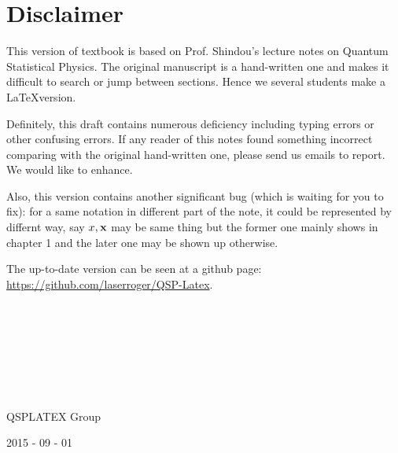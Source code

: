﻿\chapter*{Disclaimer}

This version of textbook is based on Prof. Shindou's lecture notes on Quantum Statistical Physics. The original manuscript is a hand-written one and makes it difficult to search or jump between sections. Hence we several students make a \LaTeX version. 

Definitely, this draft contains numerous deficiency including typing errors or other confusing errors. If any reader of this notes found something incorrect comparing with the original hand-written one, please send us emails to report. We would like to enhance. 

Also, this version contains another significant bug (which is waiting for you to fix): for a same notation in different part of the note, it could be represented by differnt way, say $x, \bf{x}$ may be same thing but the former one mainly shows in chapter 1 and the later one may be shown up otherwise. 

The up-to-date version can be seen at a github page: \url{https://github.com/laserroger/QSP-Latex}. 

\ 

\ 

\ 

\ 

QSPLATEX Group

2015 - 09 - 01

